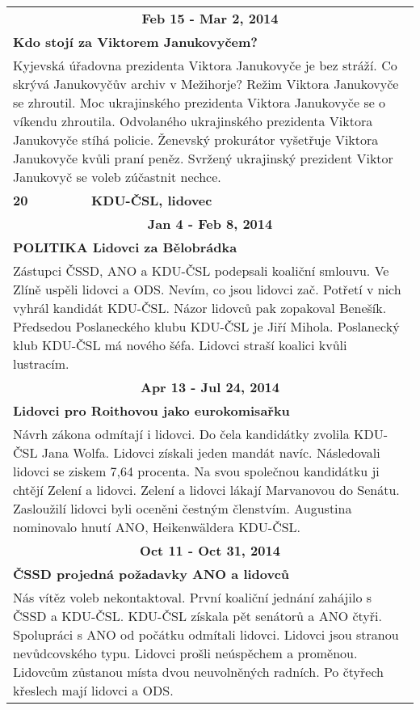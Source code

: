\begin{tabularx}{\linewidth}{l l}
                \multicolumn{2}{c}{\bf Feb 15 - Mar 2, 2014} \\
                \multicolumn{2}{p{\linewidth}}{\bf Kdo stojí za Viktorem Janukovyčem?} \\
                \multicolumn{2}{p{\linewidth}}{Kyjevská úřadovna prezidenta Viktora Janukovyče je bez stráží. Co skrývá Janukovyčův archiv v Mežihorje? Režim Viktora Janukovyče se zhroutil. Moc ukrajinského prezidenta Viktora Janukovyče se o víkendu zhroutila. Odvolaného ukrajinského prezidenta Viktora Janukovyče stíhá policie. Ženevský prokurátor vyšetřuje Viktora Janukovyče kvůli praní peněz. Svržený ukrajinský prezident Viktor Janukovyč se voleb zúčastnit nechce.} \\ \midrule
                [1.5pt]

            \bf 20 & \bf KDU-ČSL, lidovec \\ \midrule
            
                \multicolumn{2}{c}{\bf Jan 4 - Feb 8, 2014} \\
                \multicolumn{2}{p{\linewidth}}{\bf POLITIKA Lidovci za Bělobrádka} \\
                \multicolumn{2}{p{\linewidth}}{Zástupci ČSSD, ANO a KDU-ČSL podepsali koaliční smlouvu. Ve Zlíně uspěli lidovci a ODS. Nevím, co jsou lidovci zač. Potřetí v nich vyhrál kandidát KDU-ČSL. Názor lidovců pak zopakoval Benešík. Předsedou Poslaneckého klubu KDU-ČSL je Jiří Mihola. Poslanecký klub KDU-ČSL má nového šéfa. Lidovci straší koalici kvůli lustracím.} \\ \midrule
                
                \multicolumn{2}{c}{\bf Apr 13 - Jul 24, 2014} \\
                \multicolumn{2}{p{\linewidth}}{\bf Lidovci pro Roithovou jako eurokomisařku} \\
                \multicolumn{2}{p{\linewidth}}{Návrh zákona odmítají i lidovci. Do čela kandidátky zvolila KDU-ČSL Jana Wolfa. Lidovci získali jeden mandát navíc. Následovali lidovci se ziskem 7,64 procenta. Na svou společnou kandidátku ji chtějí Zelení a lidovci. Zelení a lidovci lákají Marvanovou do Senátu. Zasloužilí lidovci byli oceněni čestným členstvím. Augustina nominovalo hnutí ANO, Heikenwäldera KDU-ČSL.} \\ \midrule
                
                \multicolumn{2}{c}{\bf Oct 11 - Oct 31, 2014} \\
                \multicolumn{2}{p{\linewidth}}{\bf ČSSD projedná požadavky ANO a lidovců} \\
                \multicolumn{2}{p{\linewidth}}{ Nás vítěz voleb nekontaktoval. První koaliční jednání zahájilo s ČSSD a KDU-ČSL. KDU-ČSL získala pět senátorů a ANO čtyři. Spolupráci s ANO od počátku odmítali lidovci. Lidovci jsou stranou nevůdcovského typu. Lidovci prošli neúspěchem a proměnou. Lidovcům zůstanou místa dvou neuvolněných radních. Po čtyřech křeslech mají lidovci a ODS.} \\ \midrule
                [1.5pt]


\end{tabularx}
